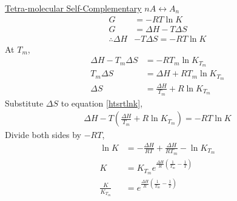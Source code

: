 \documentclass[letterpaper, 12pt]{article}
\begin{document}
\underline{Tetra-molecular Self-Complementary}  $nA \leftrightarrow A_n$
\begin{align}
	G &= -RT \ln K \label{eq1}\\
	G &= \Delta H - T\Delta S \\
	\therefore \Delta H &- T \Delta S = - RT \ln K \label{htsrtlnk}
\end{align}
At $ T_m $,
\begin{align}
	\Delta H - T_m \Delta S &= - RT_m \ln K_{T_m}\\
	T_m \Delta S &= \Delta H +RT_m\ln K_{T_m}\\
	\Delta S &= \frac{\Delta H}{T_m}+R\ln K_{T_m}
\end{align}
Substitute $ \Delta S $ to equation \ref{htsrtlnk},
\begin{align}
	\Delta H - T(\frac{\Delta H}{T_m}+R\ln K_{T_m}) = - RT \ln K
\end{align}
Divide both sides by $ -RT $,
\begin{align}
	\ln K &= -\frac{\Delta H}{RT} + \frac{\Delta H}{RT_m} - \ln K_{T_m}\\
	K &= K_{T_m} e^{\frac{\Delta H}{R}\left(\frac{1}{T_m}-\frac{1}{T}\right)} \\
	\frac{K}{K_{T_m}} &= e^{\frac{\Delta H}{R}\left(\frac{1}{T_m}-\frac{1}{T}\right)}\label{kk}
\end{align}
\end{document}
